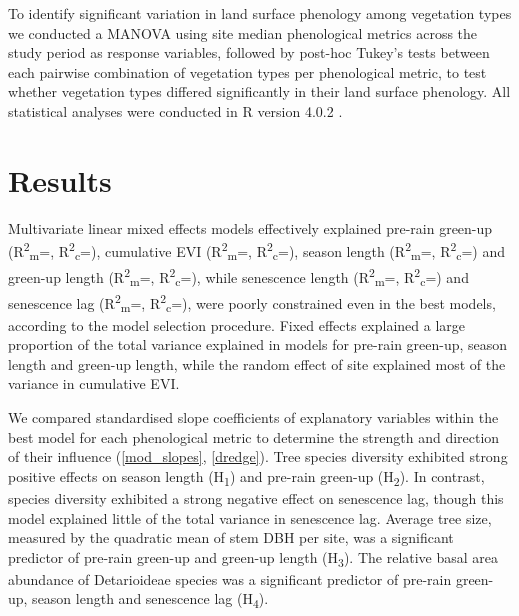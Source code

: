 \documentclass[11pt,a4paper]{article}
\begin{document}
To identify significant variation in land surface phenology among vegetation
types we conducted a MANOVA using site median phenological metrics across the
study period as response variables, followed by post-hoc Tukey's tests between
each pairwise combination of vegetation types per phenological metric, to test
whether vegetation types differed significantly in their land surface
phenology. All statistical analyses were conducted in R version 4.0.2
\citep{R2020}.

\section{Results}

Multivariate linear mixed effects models effectively explained pre-rain
green-up (R\textsuperscript{2}\textsubscript{m}=\glagRm{},
R\textsuperscript{2}\textsubscript{c}=\glagRc{}), cumulative EVI
(R\textsuperscript{2}\textsubscript{m}=\cumviRm{},
R\textsuperscript{2}\textsubscript{c}=\cumviRc{}), season length
(R\textsuperscript{2}\textsubscript{m}=\lengthRm{},
R\textsuperscript{2}\textsubscript{c}=\lengthRc{}) and green-up length
(R\textsuperscript{2}\textsubscript{m}=\grateRm{},
R\textsuperscript{2}\textsubscript{c}=\grateRc{}), while senescence length
(R\textsuperscript{2}\textsubscript{m}=\srateRm{},
R\textsuperscript{2}\textsubscript{c}=\srateRc{}) and senescence lag
(R\textsuperscript{2}\textsubscript{m}=\slagRm{},
R\textsuperscript{2}\textsubscript{c}=\slagRc{}), were poorly constrained even
in the best models, according to the model selection procedure. Fixed effects
explained a large proportion of the total variance explained in models for
pre-rain green-up, season length and green-up length, while the random effect
of site explained most of the variance in cumulative EVI.

We compared standardised slope coefficients of explanatory variables within the
best model for each phenological metric to determine the strength and direction
of their influence (\autoref{mod_slopes}, \autoref{dredge}). Tree species
diversity exhibited strong positive effects on season length
(H\textsubscript{1}) and pre-rain green-up (H\textsubscript{2}). In contrast,
species diversity exhibited a strong negative effect on senescence lag, though
this model explained little of the total variance in senescence lag. Average
tree size, measured by the quadratic mean of stem DBH per site, was a
significant predictor of pre-rain green-up and green-up length
(H\textsubscript{3}). The relative basal area abundance of Detarioideae species
was a significant predictor of pre-rain green-up, season length and senescence
lag (H\textsubscript{4}). 
\end{document}
